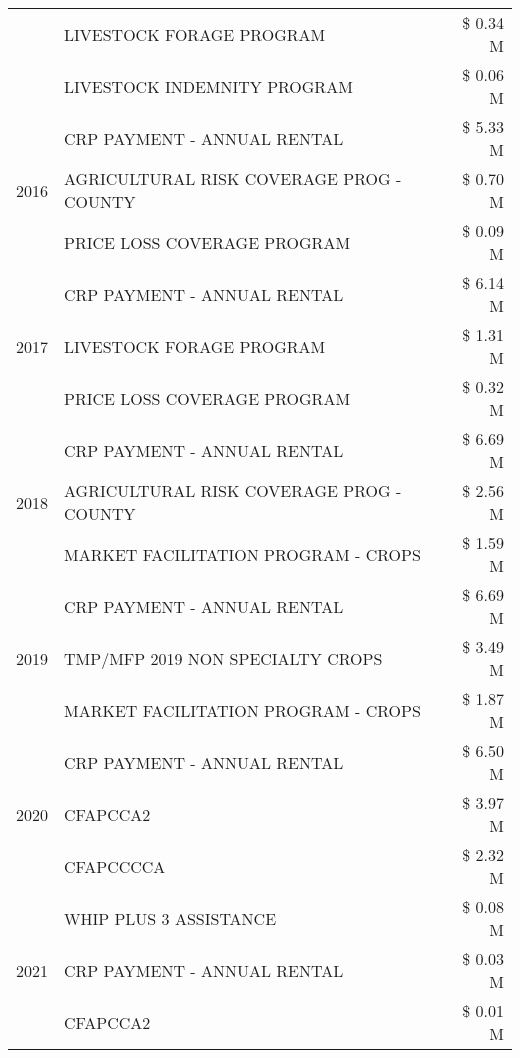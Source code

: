 \begin{tabular}{llr}
 & LIVESTOCK FORAGE PROGRAM & \$ 0.34 M \\
 & LIVESTOCK INDEMNITY PROGRAM & \$ 0.06 M \\
\cline{1-3}
\multirow[t]{3}{*}{2016} & CRP PAYMENT - ANNUAL RENTAL & \$ 5.33 M \\
 & AGRICULTURAL RISK COVERAGE PROG - COUNTY & \$ 0.70 M \\
 & PRICE LOSS COVERAGE PROGRAM & \$ 0.09 M \\
\cline{1-3}
\multirow[t]{3}{*}{2017} & CRP PAYMENT - ANNUAL RENTAL & \$ 6.14 M \\
 & LIVESTOCK FORAGE PROGRAM & \$ 1.31 M \\
 & PRICE LOSS COVERAGE PROGRAM & \$ 0.32 M \\
\cline{1-3}
\multirow[t]{3}{*}{2018} & CRP PAYMENT - ANNUAL RENTAL & \$ 6.69 M \\
 & AGRICULTURAL RISK COVERAGE PROG - COUNTY & \$ 2.56 M \\
 & MARKET FACILITATION PROGRAM - CROPS & \$ 1.59 M \\
\cline{1-3}
\multirow[t]{3}{*}{2019} & CRP PAYMENT - ANNUAL RENTAL & \$ 6.69 M \\
 & TMP/MFP 2019 NON SPECIALTY CROPS & \$ 3.49 M \\
 & MARKET FACILITATION PROGRAM - CROPS & \$ 1.87 M \\
\cline{1-3}
\multirow[t]{3}{*}{2020} & CRP PAYMENT - ANNUAL RENTAL & \$ 6.50 M \\
 & CFAPCCA2 & \$ 3.97 M \\
 & CFAPCCCCA & \$ 2.32 M \\
\cline{1-3}
\multirow[t]{3}{*}{2021} & WHIP PLUS 3 ASSISTANCE & \$ 0.08 M \\
 & CRP PAYMENT - ANNUAL RENTAL & \$ 0.03 M \\
 & CFAPCCA2 & \$ 0.01 M \\
\cline{1-3}
\bottomrule
\end{tabular}
